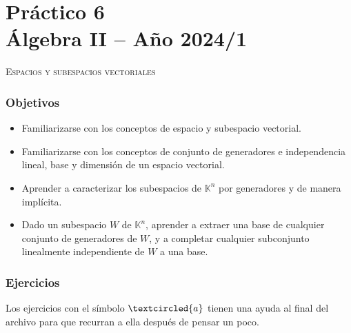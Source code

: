 \chapter*{Práctico 6 \\ Álgebra  II -- Año 2024/1}\label{practico-6}



\centerline{\textsc{Espacios y subespacios vectoriales}}
    

\subsection*{Objetivos}
    
\begin{itemize}
\item Familiarizarse con los conceptos de espacio y subespacio vectorial.
\item Familiarizarse con los conceptos de conjunto de generadores e independencia lineal, base y dimensión de un espacio vectorial.
        
\item Aprender a caracterizar los subespacios de $\mathbb K^n$ por generadores y de manera implícita.

\item Dado un subespacio $W$ de $\mathbb K^n$, aprender a extraer una base de cualquier conjunto de generadores de $W$, y a completar cualquier subconjunto linealmente independiente de $W$ a una base.

\end{itemize}
    
    
\subsection*{Ejercicios} Los ejercicios con el símbolo $\textcircled{a}$ tienen una ayuda al final del archivo para que recurran a ella después de pensar un poco.


